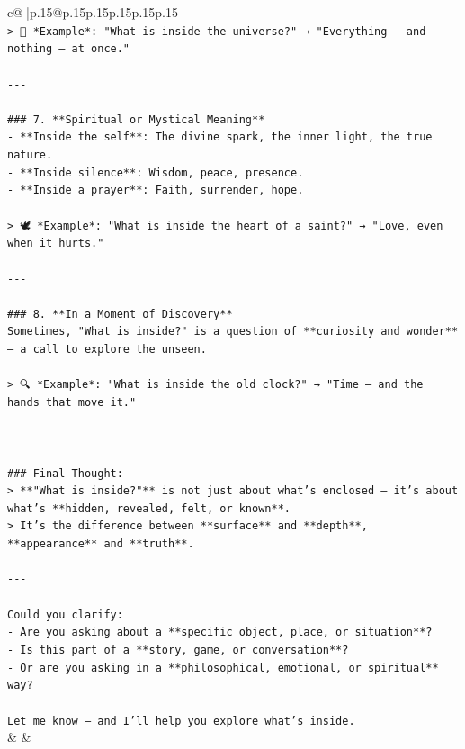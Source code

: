 \documentclass{article}
\begin{document}
{\begin{supertabular}{c@{$\;$}|p{.15\linewidth}@{}p{.15\linewidth}p{.15\linewidth}p{.15\linewidth}p{.15\linewidth}p{.15\linewidth}}
{{{\\ 
\texttt{> 🌌 *Example*: "What is inside the universe?" → "Everything — and nothing — at once."} \\
\\ 
\texttt{{-}{-}{-}} \\
\\ 
\texttt{\#\#\# 7. **Spiritual or Mystical Meaning**} \\
\texttt{{-} **Inside the self**: The divine spark, the inner light, the true nature.} \\
\texttt{{-} **Inside silence**: Wisdom, peace, presence.} \\
\texttt{{-} **Inside a prayer**: Faith, surrender, hope.} \\
\\ 
\texttt{> 🕊️ *Example*: "What is inside the heart of a saint?" → "Love, even when it hurts."} \\
\\ 
\texttt{{-}{-}{-}} \\
\\ 
\texttt{\#\#\# 8. **In a Moment of Discovery**} \\
\texttt{Sometimes, "What is inside?" is a question of **curiosity and wonder** — a call to explore the unseen.} \\
\\ 
\texttt{> 🔍 *Example*: "What is inside the old clock?" → "Time — and the hands that move it."} \\
\\ 
\texttt{{-}{-}{-}} \\
\\ 
\texttt{\#\#\# Final Thought:} \\
\texttt{> **"What is inside?"** is not just about what’s enclosed — it’s about what’s **hidden, revealed, felt, or known**.  } \\
\texttt{> It’s the difference between **surface** and **depth**, **appearance** and **truth**.} \\
\\ 
\texttt{{-}{-}{-}} \\
\\ 
\texttt{Could you clarify:} \\
\texttt{{-} Are you asking about a **specific object, place, or situation**?} \\
\texttt{{-} Is this part of a **story, game, or conversation**?} \\
\texttt{{-} Or are you asking in a **philosophical, emotional, or spiritual** way?} \\
\\ 
\texttt{Let me know — and I’ll help you explore what’s inside.} \\
            }
        }
    }
    & & \\ \\


\end{supertabular}}
\end{document}
